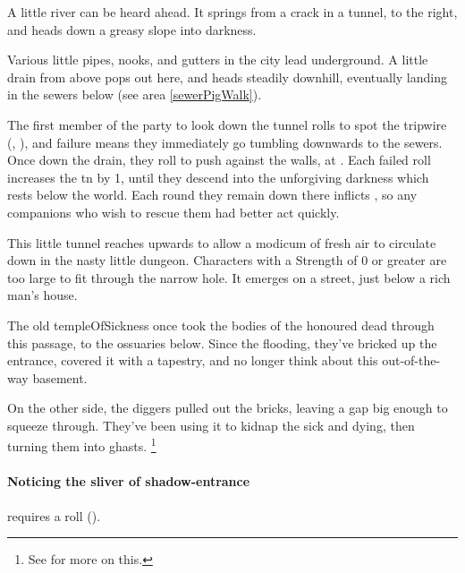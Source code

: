 \begin{multicols}{2}
\begin{boxtext}
  A little river can be heard ahead.
  It springs from a crack in a tunnel, to the right, and heads down a greasy slope into darkness.
\end{boxtext}

Various little pipes, nooks, and gutters in the city lead underground.
A little drain from above pops out here, and heads steadily downhill, eventually landing in the sewers below (see area \vref{sewerPigWalk}).

The first member of the party to look down the tunnel rolls to spot the tripwire (, \tn[8]), and failure means they immediately go tumbling downwards to the sewers.
Once down the drain, they roll  to push against the walls, at \tn[9].
Each failed roll increases the \gls{tn} by 1, until they descend into the unforgiving darkness which rests below the world.
Each round they remain down there inflicts , so any companions who wish to rescue them had better act quickly.


This little tunnel reaches upwards to allow a modicum of fresh air to circulate down in the nasty little dungeon.
Characters with a Strength of 0 or greater are too large to fit through the narrow hole.
It emerges on a street, just below a rich man's house.


\begin{exampletext}
  The old \gls{templeOfSickness} once took the bodies of the honoured dead through this passage, to the ossuaries below.
  Since the flooding, they've bricked up the entrance, covered it with a tapestry, and no longer think about this out-of-the-way basement.

  On the other side, the \glspl{digger} pulled out the bricks, leaving a gap big enough to squeeze through.
  They've been using it to kidnap the sick and dying, then turning them into ghasts.%
  \footnote{See  for more on this.}
\end{exampletext}

\paragraph{Noticing the sliver of shadow-entrance}
requires a  roll (\tn[9]).



\end{multicols}
